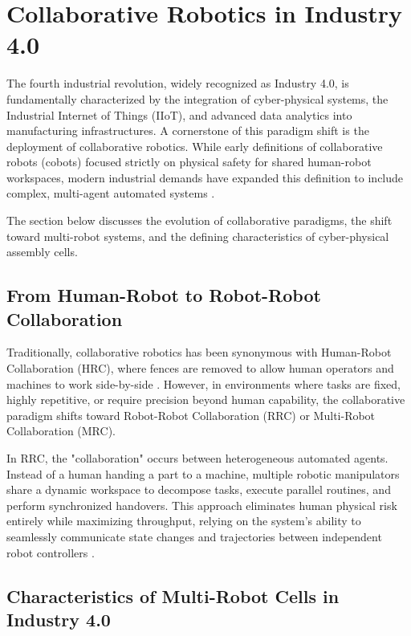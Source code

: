 \section{Collaborative Robotics in Industry 4.0}

The fourth industrial revolution, widely recognized as Industry 4.0, is fundamentally characterized by the integration of cyber-physical systems, the Industrial Internet of Things (IIoT), and advanced data analytics into manufacturing infrastructures. A cornerstone of this paradigm shift is the deployment of collaborative robotics. While early definitions of collaborative robots (cobots) focused strictly on physical safety for shared human-robot workspaces, modern industrial demands have expanded this definition to include complex, multi-agent automated systems \cite{lasi2014industry}.

The section below discusses the evolution of collaborative paradigms, the shift toward multi-robot systems, and the defining characteristics of cyber-physical assembly cells.

\subsection{From Human-Robot to Robot-Robot Collaboration}

Traditionally, collaborative robotics has been synonymous with Human-Robot Collaboration (HRC), where fences are removed to allow human operators and machines to work side-by-side \cite{matheson2019human}. However, in environments where tasks are fixed, highly repetitive, or require precision beyond human capability, the collaborative paradigm shifts toward Robot-Robot Collaboration (RRC) or Multi-Robot Collaboration (MRC). 

In RRC, the "collaboration" occurs between heterogeneous automated agents. Instead of a human handing a part to a machine, multiple robotic manipulators share a dynamic workspace to decompose tasks, execute parallel routines, and perform synchronized handovers. This approach eliminates human physical risk entirely while maximizing throughput, relying on the system's ability to seamlessly communicate state changes and trajectories between independent robot controllers \cite{kruger2009cooperation}.

\subsection{Characteristics of Multi-Robot Cells in Industry 4.0}

